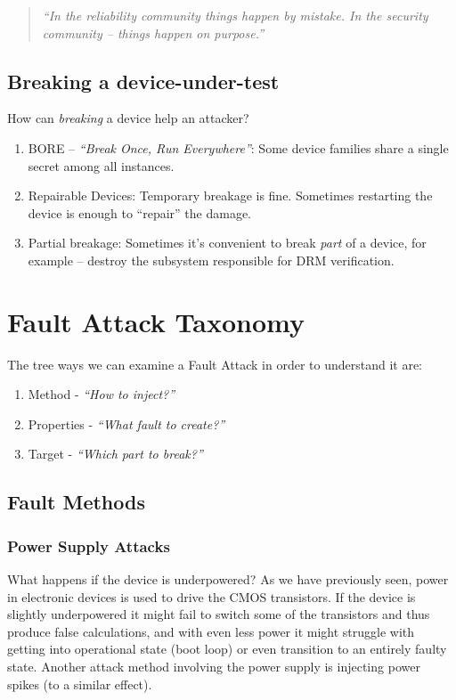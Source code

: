 \begin{quote}
	\textit{``In the reliability community things happen by mistake. In the security community -- things happen on purpose.''}
\end{quote}

\subsection*{Breaking a device-under-test}\label{subsec:breaking_a_device_under_test}
How can \emph{breaking} a device help an attacker?

\begin{enumerate}
	\item BORE -- \textit{``Break Once, Run Everywhere''}: Some device families share a single secret among all instances.
	\item Repairable Devices: Temporary breakage is fine. Sometimes restarting the device is enough to ``repair'' the damage.
	\item Partial breakage: Sometimes it's convenient to break \emph{part} of a device, for example -- destroy the subsystem responsible for DRM verification.
\end{enumerate}

\section{Fault Attack Taxonomy}\label{sec:fault_attack_taxonomy}
The tree ways we can examine a Fault Attack in order to understand it are:
\begin{enumerate}
	\item Method - \emph{``How to inject?''}
	\item Properties - \emph{``What fault to create?''}
	\item Target - \emph{``Which part to break?''}
\end{enumerate}

\subsection{Fault Methods}\label{subsec:fault_methods}

\subsubsection{Power Supply Attacks}\label{subsubsec:power_supply_attacks}
What happens if the device is underpowered?
As we have previously seen, power in electronic devices is used to drive the CMOS transistors. If the device is slightly underpowered it might fail to switch some of the transistors and thus produce false calculations, and with even less power it might  struggle with getting into operational state (boot loop) or even transition to an entirely faulty state.
Another attack method involving the power supply is injecting power spikes (to a similar effect).

